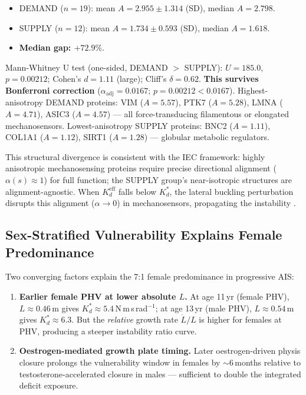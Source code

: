 \documentclass[12pt, letterpaper]{article}
\newcommand{\Kdcrit}{K_d^{*}}
\newcommand{\Kdeff}{K_d^{\mathrm{eff}}}
\newcommand{\dLdt}{\dot{L}/L}
\begin{document}
\begin{itemize}
  \item DEMAND ($n=19$): mean $A = 2.955 \pm 1.314$ (SD),
    median $A = 2.798$.
  \item SUPPLY ($n=12$): mean $A = 1.734 \pm 0.593$ (SD),
    median $A = 1.618$.
  \item \textbf{Median gap: $+72.9\%$}.
\end{itemize}

Mann-Whitney U test (one-sided, DEMAND $>$ SUPPLY): $U = 185.0$,
$p = 0.00212$; Cohen's $d = 1.11$ (large); Cliff's $\delta = 0.62$.
\textbf{This survives Bonferroni correction} ($\alpha_{\mathrm{adj}} = 0.0167$;
$p = 0.00212 < 0.0167$). Highest-anisotropy DEMAND proteins: VIM ($A = 5.57$),
PTK7 ($A = 5.28$), LMNA ($A = 4.71$), ASIC3 ($A = 4.57$) --- all
force-transducing filamentous or elongated mechanosensors.
Lowest-anisotropy SUPPLY proteins: BNC2 ($A = 1.11$), COL1A1 ($A = 1.12$),
SIRT1 ($A = 1.28$) --- globular metabolic regulators.

This structural divergence is consistent with the IEC framework: highly
anisotropic mechanosensing proteins require precise directional alignment
($\alpha(s) \approx 1$) for full function; the SUPPLY group's near-isotropic
structures are alignment-agnostic. When $\Kdeff$ falls below $\Kdcrit$,
the lateral buckling perturbation disrupts this alignment
($\alpha \to 0$) in mechanosensors, propagating the instability
\citep{Stokes2006}.

\subsection{Sex-Stratified Vulnerability Explains Female Predominance}

Two converging factors explain the 7:1 female predominance in progressive AIS:

\begin{enumerate}[label=\arabic*.]
  \item \textbf{Earlier female PHV at lower absolute $L$.} At age 11\,yr
    (female PHV), $L \approx 0.46$\,m gives $\Kdcrit \approx 5.4$\,N\,m\,s\,rad$^{-1}$;
    at age 13\,yr (male PHV), $L \approx 0.54$\,m gives $\Kdcrit \approx 6.3$. But
    the \emph{relative} growth rate $\dLdt$ is higher for females at PHV, producing
    a steeper instability ratio curve.

  \item \textbf{Oestrogen-mediated growth plate timing.} Later oestrogen-driven
    physis closure prolongs the vulnerability window in females by
    $\sim 6$\,months relative to testosterone-accelerated closure in males ---
    sufficient to double the integrated deficit exposure.
\end{enumerate}
\end{document}

